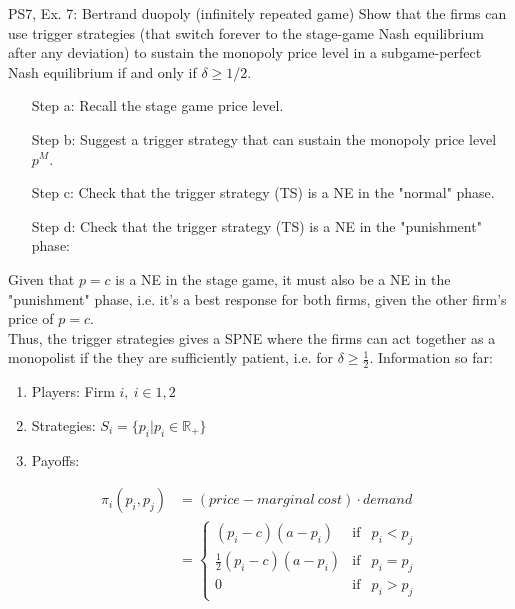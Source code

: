 \begin{frame}{PS7, Ex. 7: Bertrand duopoly (infinitely repeated game)}
    Show that the firms can use trigger strategies (that switch forever to the stage-game Nash equilibrium after any deviation) to sustain the monopoly price level in a subgame-perfect Nash equilibrium if and only if $\delta\geq1/2$.
    \vspace{-6pt}
    \begin{multicols}{2}
      \begin{itemize}
        \item[Step a:] Recall the stage game price level.
        \item[Step b:] Suggest a trigger strategy that can sustain the monopoly price level $p^M$.
        \item[Step c:] Check that the trigger strategy (TS) is a NE in the "normal" phase.
        \item[Step d:] Check that the trigger strategy (TS) is a NE in the "punishment" phase:
      \end{itemize}
      \vspace{-4pt}
      Given that $p=c$ is a NE in the stage game, it must also be a NE in the "punishment" phase, i.e. it's a best response for both firms, given the other firm's price of $p=c$.\\\medskip
      Thus, the trigger strategies gives a SPNE where the firms can act together as a monopolist if the they are sufficiently patient, i.e. for $\delta\geq\frac{1}{2}$.
      \vfill\null\columnbreak
      Information so far:
      \vspace{-4pt}
      \begin{enumerate}
        \item Players: Firm $i,\ i\in1,2$
        \item Strategies: $S_i=\{p_i|p_i\in\mathbb{R}_+\}$
        \item Payoffs:
      \end{enumerate}
      \vspace{-12pt}
      \begin{align*}
        \pi_i(p_i,p_j)&=(price-marginal\ cost)\cdot demand\\
                      &=\left\{\begin{array}{lcl}
          (p_i-c)(a-p_i)            & \text{if} & p_i<p_j\\
          \frac{1}{2}(p_i-c)(a-p_i) & \text{if} & p_i=p_j\\
          0                         & \text{if} & p_i>p_j

\end{array}
\end{align*}
\end{multicols}
\end{frame}
